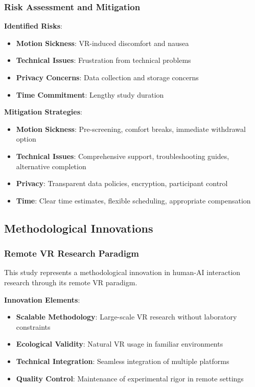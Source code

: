 \documentclass[12pt]{article}
\begin{document}
\subsubsection{Risk Assessment and Mitigation}

\textbf{Identified Risks}:
\begin{itemize}
    \item \textbf{Motion Sickness}: VR-induced discomfort and nausea
    \item \textbf{Technical Issues}: Frustration from technical problems
    \item \textbf{Privacy Concerns}: Data collection and storage concerns
    \item \textbf{Time Commitment}: Lengthy study duration
\end{itemize}

\textbf{Mitigation Strategies}:
\begin{itemize}
    \item \textbf{Motion Sickness}: Pre-screening, comfort breaks, immediate withdrawal option
    \item \textbf{Technical Issues}: Comprehensive support, troubleshooting guides, alternative completion
    \item \textbf{Privacy}: Transparent data policies, encryption, participant control
    \item \textbf{Time}: Clear time estimates, flexible scheduling, appropriate compensation
\end{itemize}

\subsection{Methodological Innovations}

\subsubsection{Remote VR Research Paradigm}

This study represents a methodological innovation in human-AI interaction research through its remote VR paradigm.

\textbf{Innovation Elements}:
\begin{itemize}
    \item \textbf{Scalable Methodology}: Large-scale VR research without laboratory constraints
    \item \textbf{Ecological Validity}: Natural VR usage in familiar environments
    \item \textbf{Technical Integration}: Seamless integration of multiple platforms
    \item \textbf{Quality Control}: Maintenance of experimental rigor in remote settings
\end{itemize}
\end{document}
